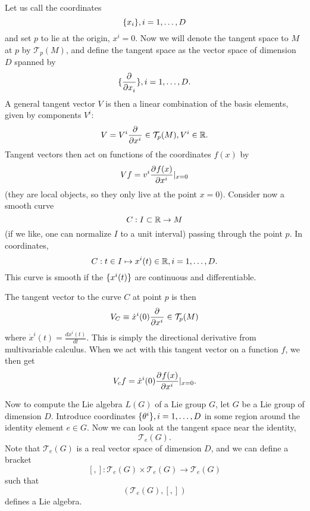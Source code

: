 Let us call the coordinates $$\set{x_i},i=1,\ldots,D$$ and set $p$ to lie at the origin, $x^i=0$. Now we will denote the tangent space to $M$ at $p$ by $\mathcal{T}_p(M)$, and define the tangent space as the vector space of dimension $D$ spanned by
$$\set{\P{}{x_i}},i=1,\ldots, D.$$
A general tangent vector $V$ is then a linear combination of the basis elements, given by components $V^i$:
$$V=V^i \P{}{{x^i}}\in \mathcal{T}_p(M), V^i \in \RR.$$
Tangent vectors then act on functions of the coordinates $f(x)$ by
$$V f = v^i \P{f(x)}{{x^i}}|_{x=0}$$
(they are local objects, so they only live at the point $x=0$).
Consider now a smooth curve
$$C:I\subset \RR \to M$$ (if we like, one can normalize $I$ to a unit interval) passing through the point $p$. In coordinates,
$$C:t\in I \mapsto x^i(t) \in \RR, i=1,\ldots,D.$$
This curve is smooth if the $\set{x^i(t)}$ are continuous and differentiable.

The tangent vector to the curve $C$ at point $p$ is then
$$V_C\equiv\dot x^i(0)\P{}{{x^i}}\in \mathcal{T}_p(M)$$
where $\dot x^i(t)=\frac{dx^i(t)}{dt}$. This is simply the directional derivative from multivariable calculus. When we act with this tangent vector on a function $f$, we then get
$$V_c f= \dot x^{i}(0) \P{f(x)}{{x^i}}|_{x=0}.$$

Now to compute the Lie algebra $L(G)$ of a Lie group $G$, let $G$ be a Lie group of dimension $D$. Introduce coordinates $\set{\theta^i}, i=1,\ldots,D$ in some region around the identity element $e\in G$. Now we can look at the tangent space near the identity,
$$\mathcal{T}_e(G).$$
Note that $\mathcal{T}_e(G)$ is a real vector space of dimension $D$, and we can define a bracket
$$[,]: \mathcal{T}_e(G)\times \mathcal{T}_e(G) \to \mathcal{T}_e(G)$$
such that
$$(\mathcal{T}_e(G),[,])$$ defines a Lie algebra.

